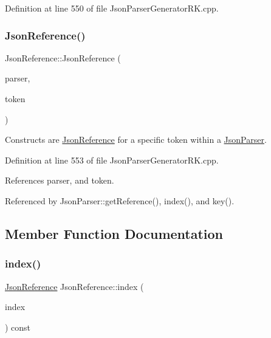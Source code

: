 Definition at line 550 of file Json\+Parser\+Generator\+R\+K.\+cpp.

\mbox{\label{class_json_reference_a9b1d0b53240a31cd66918b76ffbfac61}} 
\subsubsection{\texorpdfstring{Json\+Reference()}{JsonReference()}\hspace{0.1cm}{\footnotesize\ttfamily [2/2]}}
{\footnotesize\ttfamily Json\+Reference\+::\+Json\+Reference (\begin{DoxyParamCaption}\item[{const \hyperlink{class_json_parser}{Json\+Parser} $\ast$}]{parser,  }\item[{const \hyperlink{struct_json_parser_generator_r_k_1_1jsmntok__t}{Json\+Parser\+Generator\+R\+K\+::jsmntok\+\_\+t} $\ast$}]{token }\end{DoxyParamCaption})}



Constructs are \hyperlink{class_json_reference}{Json\+Reference} for a specific token within a \hyperlink{class_json_parser}{Json\+Parser}. 



Definition at line 553 of file Json\+Parser\+Generator\+R\+K.\+cpp.



References parser, and token.



Referenced by Json\+Parser\+::get\+Reference(), index(), and key().



\subsection{Member Function Documentation}
\mbox{\label{class_json_reference_aecf18512e22e7efeba7572072576e09e}} 
\subsubsection{\texorpdfstring{index()}{index()}}
{\footnotesize\ttfamily \hyperlink{class_json_reference}{Json\+Reference} Json\+Reference\+::index (\begin{DoxyParamCaption}\item[{size\+\_\+t}]{index }\end{DoxyParamCaption}) const}



